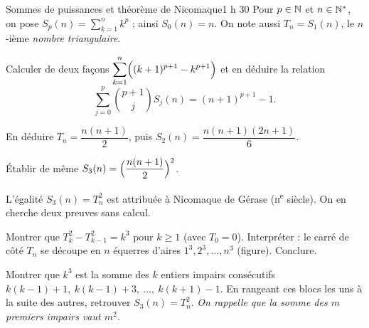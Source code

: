 

\begin{defi}{Sommes de puissances et théorème de Nicomaque}{1 h 30}
Pour $p\in\mathbb{N}$ et $n\in\mathbb{N}^{*}$, on pose
$S_p(n)=\displaystyle\sum_{k=1}^{n}k^{p}$ ; ainsi $S_0(n)=n$. On note aussi
$T_n=S_1(n)$, le $n$-ième \emph{nombre triangulaire}.

\begin{questions}
  \item Calculer de deux façons
    $\displaystyle\sum_{k=1}^{n}\Bigl((k+1)^{p+1}-k^{p+1}\Bigr)$ et en
    déduire la relation
    \[
    \sum_{j=0}^{p}\binom{p+1}{j}S_j(n)=(n+1)^{p+1}-1 .
    \]
  \item En déduire $T_n=\dfrac{n(n+1)}{2}$, puis
    $S_2(n)=\dfrac{n(n+1)(2n+1)}{6}$.
  \item Établir de même $S_3(n)=\Bigl(\dfrac{n(n+1)}{2}\Bigr)^{2}$.
\end{questions}

L'égalité $S_3(n)=T_n^{2}$ est attribuée à Nicomaque de Gérase
(\textsc{ii}\textsuperscript{e} siècle). On en cherche deux preuves sans calcul.
\begin{questions}[resume]
  \item Montrer que $T_k^{2}-T_{k-1}^{2}=k^{3}$ pour $k\geqslant1$ (avec
    $T_0=0$). Interpréter : le carré de côté $T_n$ se découpe en $n$
    équerres d'aires $1^{3},2^{3},\dots,n^{3}$ (figure). Conclure.
  \item Montrer que $k^{3}$ est la somme des $k$ entiers impairs
    consécutifs $k(k-1)+1,\ k(k-1)+3,\ \dots,\ k(k+1)-1$. En rangeant ces
    blocs les uns à la suite des autres, retrouver $S_3(n)=T_n^{2}$.
    \emph{On rappelle que la somme des $m$ premiers impairs vaut $m^{2}$.}
\end{questions}

\medskip
\begin{center}
\\[0.5mm]
\end{center}


\end{defi}
